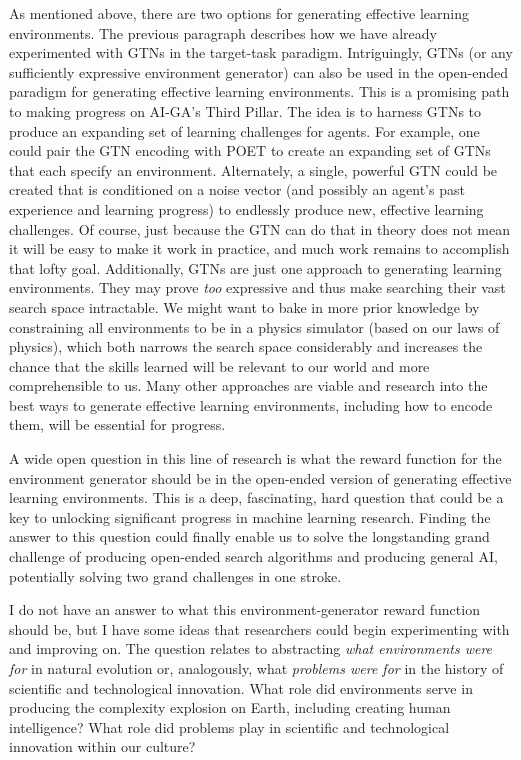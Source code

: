 \documentclass{article}
\begin{document}
As mentioned above, there are two options for generating effective learning environments. The previous paragraph describes how we have already experimented with GTNs in the target-task paradigm. Intriguingly, GTNs (or any sufficiently expressive environment generator) can also be used in the open-ended paradigm for generating effective learning environments. This is a promising path to making progress on AI-GA's Third Pillar. The idea is to harness GTNs to produce an expanding set of learning challenges for agents. For example, one could pair the GTN encoding with POET to create an expanding set of GTNs that each specify an environment. Alternately, a single, powerful GTN could be created that is conditioned on a noise vector (and possibly an agent's past experience and learning progress) to endlessly produce new, effective learning challenges. Of course, just because the GTN can do that in theory does not mean it will be easy to make it work in practice, and much work remains to accomplish that lofty goal. Additionally, GTNs are just one approach to generating learning environments. They may prove \emph{too} expressive and thus make searching their vast search space intractable. We might want to bake in more prior knowledge by constraining all environments to be in a physics simulator (based on our laws of physics), which both narrows the search space considerably and increases the chance that the skills learned will be relevant to our world and more comprehensible to us. Many other approaches are viable and research into the best ways to generate effective learning environments, including how to encode them, will be essential for progress. 

A wide open question in this line of research is what the reward function for the environment generator should be in the open-ended version of generating effective learning environments. This is a deep, fascinating, hard question that could be a key to unlocking significant progress in machine learning research. Finding the answer to this question could finally enable us to solve the longstanding grand challenge of producing open-ended search algorithms \cite{stanley:open} and producing general AI, potentially solving two grand challenges in one stroke. 

I do not have an answer to what this environment-generator reward function should be, but I have some ideas that researchers could begin experimenting with and improving on. The question relates to abstracting \emph{what environments were for} in natural evolution or, analogously, what \emph{problems were for} in the history of scientific and technological innovation. What role did environments serve in producing the complexity explosion on Earth, including creating human intelligence? What role did problems play in scientific and technological innovation within our culture? 
\end{document}
